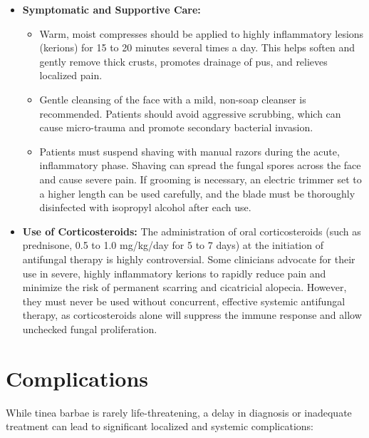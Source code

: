 \begin{itemize}
\begin{itemize}
        \item Topical antifungal creams, such as clotrimazole 1\%, miconazole 2\%, terbinafine 1\%, or ciclopirox olamine 1\%, can be applied to the surrounding skin once or twice daily.
    \end{itemize}
    \item \textbf{Symptomatic and Supportive Care:}
    \begin{itemize}
        \item Warm, moist compresses should be applied to highly inflammatory lesions (kerions) for 15 to 20 minutes several times a day. This helps soften and gently remove thick crusts, promotes drainage of pus, and relieves localized pain.
        \item Gentle cleansing of the face with a mild, non-soap cleanser is recommended. Patients should avoid aggressive scrubbing, which can cause micro-trauma and promote secondary bacterial invasion.
        \item Patients must suspend shaving with manual razors during the acute, inflammatory phase. Shaving can spread the fungal spores across the face and cause severe pain. If grooming is necessary, an electric trimmer set to a higher length can be used carefully, and the blade must be thoroughly disinfected with isopropyl alcohol after each use.
    \end{itemize}
    \item \textbf{Use of Corticosteroids:} The administration of oral corticosteroids (such as prednisone, 0.5 to 1.0 mg/kg/day for 5 to 7 days) at the initiation of antifungal therapy is highly controversial. Some clinicians advocate for their use in severe, highly inflammatory kerions to rapidly reduce pain and minimize the risk of permanent scarring and cicatricial alopecia. However, they must never be used without concurrent, effective systemic antifungal therapy, as corticosteroids alone will suppress the immune response and allow unchecked fungal proliferation.
\end{itemize}

\section*{Complications}
While tinea barbae is rarely life-threatening, a delay in diagnosis or inadequate treatment can lead to significant localized and systemic complications:

